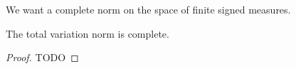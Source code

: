 
\sbasic



\sstart



We want a complete
norm on the space
of finite signed measures.


\begin{prop}
The
total variation norm
is complete.
\begin{proof}
TODO
\end{proof}
\end{prop}

\strats
